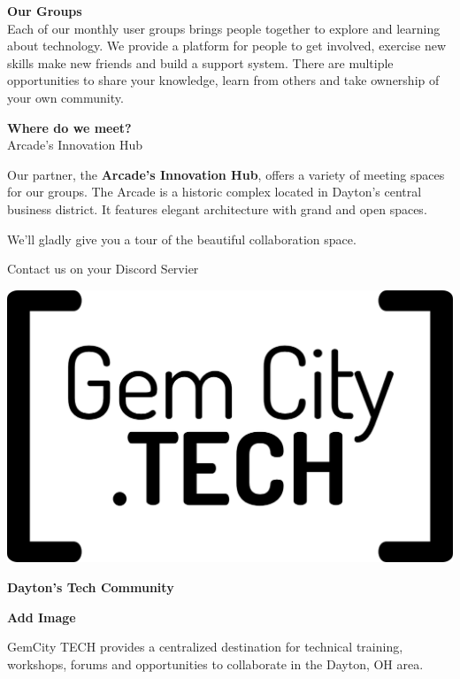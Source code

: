 \documentclass[14pt]{extarticle}
\begin{document}
\begin{multicols}{3}

\columnbreak

\textbf{Our Groups}\\
Each of our monthly user groups brings people together to explore and
learning about technology. We provide a platform for people to get
involved, exercise new skills make new friends and build a support
system. There are multiple opportunities to share your knowledge, learn
from others and take ownership of your own community.

\textbf{Where do we meet?}\\
Arcade's Innovation Hub

Our partner, the \textbf{Arcade’s Innovation Hub}, offers a variety of
meeting spaces for our groups. The Arcade is a historic complex located
in Dayton's central business district. It features elegant architecture
with grand and open spaces.

We'll gladly give you a tour of the beautiful collaboration space.

Contact us on your Discord Servier


\columnbreak

\includegraphics{img/GCTSquareWhiteForeground.png}

\textbf{Dayton's Tech Community}

\textbf{Add Image}

GemCity TECH provides a centralized destination for technical training,
workshops, forums and opportunities to collaborate in the Dayton, OH
area.



\end{multicols}
\end{document}
